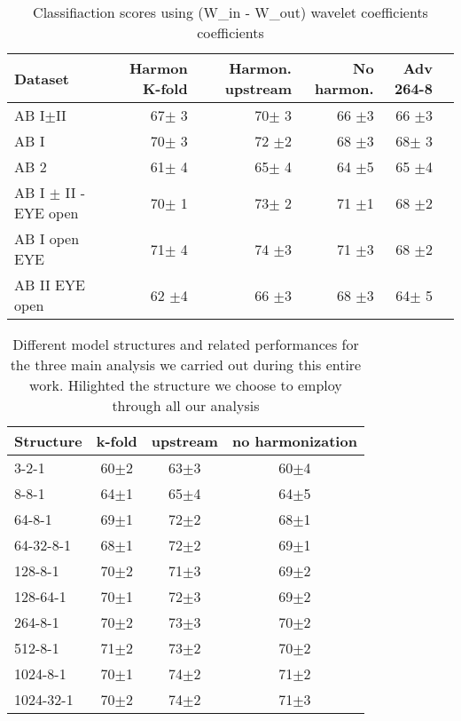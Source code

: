 \documentclass[10pt]{report}
\begin{document}
\begin{table}[!htp]\centering
\scriptsize
\begin{tabular}{lrrrrr}\toprule
Dataset &Harmon K-fold &Harmon. upstream &No harmon. &Adv 264-8 \\\midrule
AB I$\pm$II &67$\pm$ 3 &70$\pm$ 3 &66 $\pm$3 &66 $\pm$3 \\
AB I &70$\pm$ 3 &72 $\pm$2 &68 $\pm$3 &68$\pm$ 3 \\
AB 2 &61$\pm$ 4 &65$\pm$ 4 &64 $\pm$5 &65 $\pm$4 \\
AB I $\pm$ II - EYE open &70$\pm$ 1 &73$\pm$ 2 &71 $\pm$1 &68 $\pm$2 \\
AB I open EYE &71$\pm$ 4 &74 $\pm$3 &71 $\pm$3 &68 $\pm$2 \\
AB II EYE open &62 $\pm$4 &66 $\pm$3 &68 $\pm$3 &64$\pm$ 5 \\
\bottomrule
\end{tabular}
\caption{Classifiaction scores using (W\_in - W\_out) wavelet coefficients coefficients}
\label{tab:classification_win-wout}
\end{table}





\begin{table}[!htp]\centering
\begin{tabular}{lccc}
\toprule
Structure &k-fold &upstream &no harmonization \\
\midrule
3-2-1 &60$\pm$2 &63$\pm$3 &60$\pm$4 \\
8-8-1 &64$\pm$1 &65$\pm$4 &64$\pm$5 \\
64-8-1 &69$\pm$1 &72$\pm$2 &68$\pm$1 \\
64-32-8-1 &68$\pm$1 &72$\pm$2 &69$\pm$1 \\
128-8-1 &70$\pm$2 &71$\pm$3 &69$\pm$2 \\
128-64-1 &70$\pm$1 &72$\pm$3 &69$\pm$2 \\
\cellcolor[HTML]{ffff00}264-8-1 &\cellcolor[HTML]{ffff00}70$\pm$2 &\cellcolor[HTML]{ffff00}73$\pm$3 &\cellcolor[HTML]{ffff00}70$\pm$2 \\
512-8-1 &71$\pm$2 &73$\pm$2 &70$\pm$2 \\
1024-8-1 &70$\pm$1 &74$\pm$2 &71$\pm$2 \\
1024-32-1 &70$\pm$2 &74$\pm$2 &71$\pm$3 \\
\bottomrule
\end{tabular}
\caption{Different model structures and related performances for the three main analysis we carried out during this entire work. Hilighted the structure we choose to employ through all our analysis}\label{}
\end{table}
\end{document}
